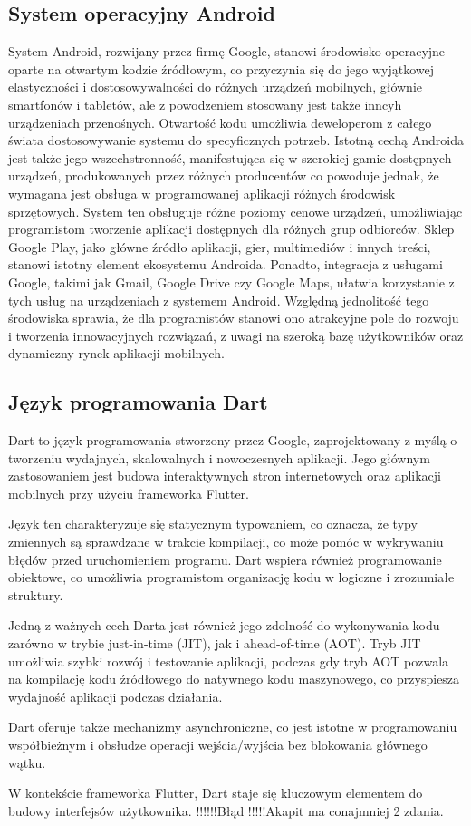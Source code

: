 \documentclass[12pt,twoside,draft]{article}
\begin{document}
\subsection{System operacyjny Android}
{System Android, rozwijany przez firmę Google, stanowi środowisko operacyjne oparte na otwartym kodzie źródłowym,
   co przyczynia się do jego wyjątkowej elastyczności i dostosowywalności do różnych urządzeń mobilnych, głównie 
   smartfonów i tabletów, ale z powodzeniem stosowany jest także inncyh urządzeniach przenośnych.
    Otwartość kodu umożliwia deweloperom z całego świata dostosowywanie systemu do specyficznych 
   potrzeb. Istotną cechą Androida jest także jego wszechstronność, manifestująca się w szerokiej gamie dostępnych 
   urządzeń, produkowanych przez różnych producentów co powoduje jednak, że wymagana jest obsługa w programowanej aplikacji różnych środowisk sprzętowych.
    System ten obsługuje różne poziomy cenowe urządzeń, umożliwiając 
   programistom tworzenie aplikacji dostępnych dla różnych grup odbiorców. Sklep Google Play, jako główne źródło 
   aplikacji, gier, multimediów i innych treści, stanowi istotny element ekosystemu Androida. Ponadto, integracja 
   z usługami Google, takimi jak Gmail, Google Drive czy Google Maps, ułatwia korzystanie z tych usług na urządzeniach 
   z systemem Android. Względną jednolitość tego środowiska sprawia, że dla programistów stanowi ono atrakcyjne pole do 
   rozwoju i tworzenia innowacyjnych rozwiązań, z uwagi na szeroką bazę użytkowników oraz dynamiczny rynek aplikacji mobilnych.}
\subsection{Język programowania Dart}
{Dart to język programowania stworzony przez Google, zaprojektowany z myślą o tworzeniu wydajnych, skalowalnych i nowoczesnych aplikacji. 
Jego głównym zastosowaniem jest budowa interaktywnych stron internetowych oraz aplikacji mobilnych przy użyciu frameworka Flutter.

Język ten charakteryzuje się statycznym typowaniem, co oznacza, że typy zmiennych są sprawdzane w trakcie kompilacji, co może pomóc 
w wykrywaniu błędów przed uruchomieniem programu. Dart wspiera również programowanie obiektowe,
 co umożliwia programistom organizację kodu w logiczne i zrozumiałe struktury.

Jedną z ważnych cech Darta jest również jego zdolność do wykonywania kodu zarówno w trybie just-in-time (JIT),
 jak i ahead-of-time (AOT). Tryb JIT umożliwia szybki rozwój i testowanie aplikacji, podczas gdy tryb AOT pozwala na kompilację
  kodu źródłowego do natywnego kodu maszynowego, co przyspiesza wydajność aplikacji podczas działania.

Dart oferuje także mechanizmy asynchroniczne, co jest istotne w programowaniu współbieżnym i 
obsłudze operacji wejścia/wyjścia bez blokowania głównego wątku.

W kontekście frameworka Flutter, Dart staje się kluczowym elementem do budowy interfejsów użytkownika. !!!!!!Błąd !!!!!Akapit ma conajmniej 2 zdania. }
\end{document}

